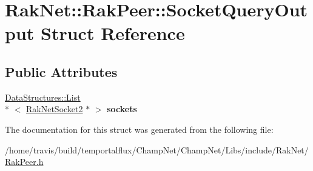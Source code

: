 \hypertarget{struct_rak_net_1_1_rak_peer_1_1_socket_query_output}{\section{Rak\-Net\-:\-:Rak\-Peer\-:\-:Socket\-Query\-Output Struct Reference}
\label{struct_rak_net_1_1_rak_peer_1_1_socket_query_output}
}
\subsection*{Public Attributes}
\begin{DoxyCompactItemize}
\item 
\hypertarget{struct_rak_net_1_1_rak_peer_1_1_socket_query_output_a72201cea7e48d1c22480e9cbb06a9e5a}{\hyperlink{class_data_structures_1_1_list}{Data\-Structures\-::\-List}\\*
$<$ \hyperlink{class_rak_net_1_1_rak_net_socket2}{Rak\-Net\-Socket2} $\ast$ $>$ {\bfseries sockets}}\label{struct_rak_net_1_1_rak_peer_1_1_socket_query_output_a72201cea7e48d1c22480e9cbb06a9e5a}

\end{DoxyCompactItemize}


The documentation for this struct was generated from the following file\-:\begin{DoxyCompactItemize}
\item 
/home/travis/build/temportalflux/\-Champ\-Net/\-Champ\-Net/\-Libs/include/\-Rak\-Net/\hyperlink{_rak_peer_8h}{Rak\-Peer.\-h}\end{DoxyCompactItemize}
